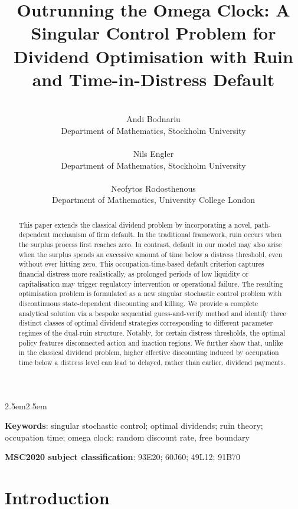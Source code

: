\documentclass[11pt]{article} %
\title{Outrunning the Omega Clock: A Singular Control Problem for Dividend Optimisation with Ruin and Time-in-Distress Default}
\author{
\\ Andi Bodnariu \\Department of Mathematics, Stockholm University\\
\\Nils Engler\\Department of Mathematics, Stockholm University\\
\\Neofytos Rodosthenous\\Department of Mathematics, University College London
}
\numberwithin{komcounter}{section}
\numberwithin{equation}{section}
\numberwithin{theorem}{section}
\begin{document}
\maketitle

\begin{abstract} 
This paper extends the classical dividend problem by incorporating a novel, path-dependent mechanism of firm default. In the traditional framework, ruin occurs when the surplus process first reaches zero. In contrast, default in our model may also arise when the surplus spends an excessive amount of time below a distress threshold, even without ever hitting zero. This occupation-time-based default criterion captures financial distress more realistically, as prolonged periods of low liquidity or capitalisation may trigger regulatory intervention or operational failure.
The resulting optimisation problem is formulated as a new singular stochastic control problem with discontinuous state-dependent discounting and killing. 
We provide a complete analytical solution via a bespoke sequential guess-and-verify method and identify three distinct classes of optimal dividend strategies corresponding to different parameter regimes of the dual-ruin structure. Notably, for certain distress thresholds, the optimal policy features disconnected action and inaction regions.
We further show that, unlike in the classical dividend problem, higher effective discounting induced by occupation time below a distress level can lead to delayed, rather than earlier, dividend payments.
\end{abstract} 
\begin{adjustwidth}{2.5em}{2.5em}

\smallskip

{\textbf{Keywords}}: singular stochastic control; optimal dividends; ruin theory; occupation time; omega clock; random discount rate, free boundary

\smallskip
\noindent
{\textbf{MSC2020 subject classification}}: 93E20; 60J60; 49L12; 91B70 
\end{adjustwidth}

\section{Introduction}
\end{document}
